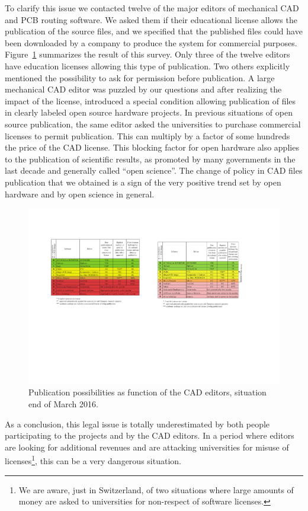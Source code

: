 \documentclass[letterpaper, 10 pt, conference]{ieeeconf}  %
\begin{document}
To clarify this issue we contacted twelve of the major editors of mechanical CAD and PCB routing software.
We asked them if their educational license allows the publication of the source files, and we specified that the published files could have been downloaded by a company to produce the system for commercial purposes.
Figure~\ref{fig:editors} summarizes the result of this survey.
Only three of the twelve editors have education licenses allowing this type of publication. 
Two others explicitly mentioned the possibility to ask for permission before publication.
A large mechanical CAD editor was puzzled by our questions and after realizing the impact of the license, introduced a special condition allowing publication of files in clearly labeled open source hardware projects.
In previous situations of open source publication, the same editor asked the universities to purchase commercial licenses to permit publication.
This can multiply by a factor of some hundreds the price of the CAD license.
This blocking factor for open hardware also applies to the publication of scientific results, as promoted by many governments in the last decade and generally called ``open science''.
The change of policy in CAD files publication that we obtained is a sign of the very positive trend set by open hardware and by open science in general.

\begin{figure}
\centering
\includegraphics[width=\columnwidth]{figures/table}
\caption{Publication possibilities as function of the CAD editors, situation end of March 2016.}
\label{fig:editors}
\end{figure}

As a conclusion, this legal issue is totally underestimated by both people participating to the projects and by the CAD editors. 
In a period where editors are looking for additional revenues and are attacking universities for misuse of licenses\footnote{We are aware, just in Switzerland, of two situations where large amounts of money are asked to universities for non-respect of software licenses.}, this can be a very dangerous situation.
\end{document}

